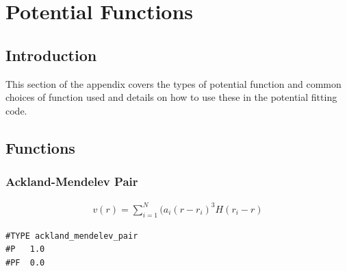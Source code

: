 \chapter{Potential Functions}
\label{chapter:potentialfunctions}

\FloatBarrier
\section{Introduction}

This section of the appendix covers the types of potential function and common choices of function used and details on how to use these in the potential fitting code.



\section{Functions}



\subsection{Ackland-Mendelev Pair}

\begin{equation}
\begin{split}
v(r) = \sum_{i=1}^N (a_i (r - r_i)^3 H(r_i - r)
\end{split}
\label{eq:ackland_mendelev_pair}
\end{equation}

\begin{lstlisting}[style=pseudocode,caption={Ackland Mendelev Pair}]
#TYPE ackland_mendelev_pair
#P   1.0
#PF  0.0
\end{lstlisting}

